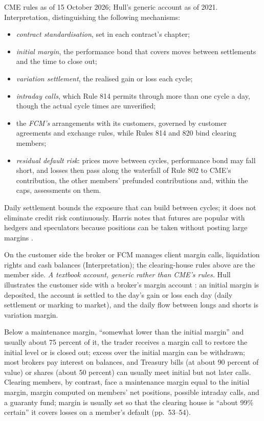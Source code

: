 \begin{qfmechanism}
 CME rules as of 15 October 2026; Hull's generic account as of 2021. Interpretation, distinguishing the following mechanisms:
\begin{itemize}
\item \emph{contract standardisation}, set in each contract's chapter;
\item \emph{initial margin}, the performance bond that covers moves between settlements and the time to close out;
\item \emph{variation settlement}, the realised gain or loss each cycle;
\item \emph{intraday calls}, which Rule 814 permits through more than one cycle a day, though the actual cycle times are unverified;
\item the \emph{FCM's} arrangements with its customers, governed by customer agreements and exchange rules, while Rules 814 and 820 bind clearing members;
\item \emph{residual default risk}: prices move between cycles, performance bond may fall short, and losses then pass along the waterfall of Rule 802 to CME's contribution, the other members' prefunded contributions and, within the caps, assessments on them.
\end{itemize}
Daily settlement bounds the exposure that can build between cycles; it does not eliminate credit risk continuously. Harris notes that futures are popular with hedgers and speculators because positions can be taken without posting large margins \citep[chap.~``Index and Portfolio Markets'', sec.~23.5, p.~492]{alpha-harris}.

 On the customer side the broker or FCM manages client margin calls, liquidation rights and cash balances (Interpretation); the clearing-house rules above are the member side. \emph{A textbook account, generic rather than CME's rules.} Hull illustrates the customer side with a broker's margin account \citep[chap.~2, ``Futures Markets and Central Counterparties'', sec.~2.4, pp.~51--54]{s7-hulloptions}: an initial margin is deposited, the account is settled to the day's gain or loss each day (daily settlement or marking to market), and the daily flow between longs and shorts is variation margin.

Below a maintenance margin, ``somewhat lower than the initial margin'' and usually about 75 percent of it, the trader receives a margin call to restore the initial level or is closed out; excess over the initial margin can be withdrawn; most brokers pay interest on balances, and Treasury bills (at about 90 percent of value) or shares (about 50 percent) can usually meet initial but not later calls. Clearing members, by contrast, face a maintenance margin equal to the initial margin, margin computed on members' net positions, possible intraday calls, and a guaranty fund; margin is usually set so that the clearing house is ``about 99\% certain'' it covers losses on a member's default (pp.~53--54).


\end{qfmechanism}
